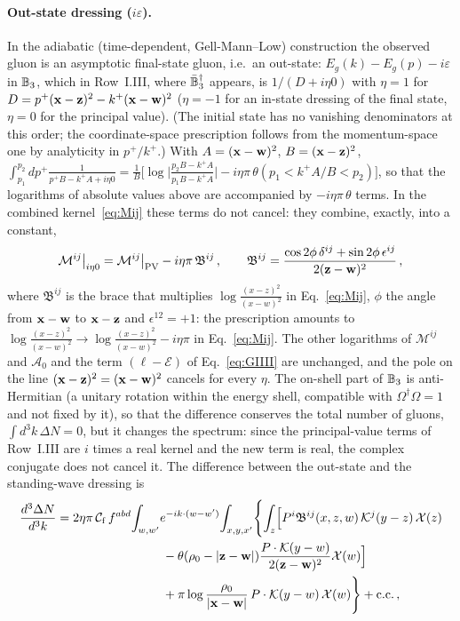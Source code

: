 \paragraph{Out-state dressing ($i\varepsilon$).} In the adiabatic (time-dependent, Gell-Mann--Low) construction the observed gluon is an asymptotic final-state gluon, i.e.\ an out-state: $E_g(k)-E_g(p)-i\varepsilon$ in $\mathbb{B}_3$, which in Row~I.III, where $\bar{\mathbb{B}}_3^\dagger$ appears, is $1/(D+i\eta0)$ with $\eta=1$ for $D=p^+(\mathbf{x}-\mathbf{z})^2-k^+(\mathbf{x}-\mathbf{w})^2$ ($\eta=-1$ for an in-state dressing of the final state, $\eta=0$ for the principal value). (The initial state has no vanishing denominators at this order; the coordinate-space prescription follows from the momentum-space one by analyticity in $p^+/k^+$.) With $A=(\mathbf{x}-\mathbf{w})^2$, $B=(\mathbf{x}-\mathbf{z})^2$, $\int_{p_1}^{p_2}dp^+\frac{1}{p^+B-k^+A+i\eta0}=\frac1B\big[\log\big|\frac{p_2B-k^+A}{p_1B-k^+A}\big|-i\eta\pi\,\theta(p_1<k^+A/B<p_2)\big]$, so that the logarithms of absolute values above are accompanied by $-i\eta\pi\,\theta$ terms. In the combined kernel~\eqref{eq:Mij} these terms do not cancel: they combine, exactly, into a constant,
\begin{align}\label{eq:Mijieps}
\mathcal M^{ij}\big|_{i\eta0}=\mathcal M^{ij}\big|_{\rm PV}-i\eta\pi\,\mathfrak B^{ij}\,,\qquad \mathfrak B^{ij}=\frac{\cos2\phi\,\delta^{ij}+\sin2\phi\,\epsilon^{ij}}{2(\mathbf{z}-\mathbf{w})^2}\,,
\end{align}
where $\mathfrak B^{ij}$ is the brace that multiplies $\log\frac{(x-z)^2}{(x-w)^2}$ in Eq.~\eqref{eq:Mij}, $\phi$ the angle from $\mathbf{x}-\mathbf{w}$ to $\mathbf{x}-\mathbf{z}$ and $\epsilon^{12}=+1$: the prescription amounts to $\log\frac{(x-z)^2}{(x-w)^2}\to\log\frac{(x-z)^2}{(x-w)^2}-i\eta\pi$ in Eq.~\eqref{eq:Mij}. The other logarithms of $\mathcal M^{ij}$ and $\mathcal A_0$ and the term $(\ell-\mathcal E)$ of Eq.~\eqref{eq:GIIII} are unchanged, and the pole on the line $(\mathbf{x}-\mathbf{z})^2=(\mathbf{x}-\mathbf{w})^2$ cancels for every $\eta$. The on-shell part of $\mathbb{B}_3$ is anti-Hermitian (a unitary rotation within the energy shell, compatible with $\Omega^\dagger\Omega=1$ and not fixed by it), so that the difference conserves the total number of gluons, $\int d^3k\,\Delta N=0$, but it changes the spectrum: since the principal-value terms of Row~I.III are $i$ times a real kernel and the new term is real, the complex conjugate does not cancel it. The difference between the out-state and the standing-wave dressing is
\begin{align}\label{eq:DeltaN}
\frac{d^3\Delta N}{d^3k}&=2\eta\pi\,\mathcal C_{\rm f}\,f^{abd}\!\int_{w,w'}\!e^{-ik\cdot(w-w')}\!\int_{x,y,x'}\!\Bigg\{\!\int_z\!\Big[P^i\mathfrak B^{ij}(x,z,w)\,\Kv^j(y-z)\,\mathcal X(z)\notag\\
&\hspace{3cm}-\theta(\rho_0-|\v z-\v w|)\frac{P\cdot\Kv(y-w)}{2(\v z-\v w)^2}\mathcal X(w)\Big]\notag\\&\hspace{3cm}+\pi\log\frac{\rho_0}{|\v x-\v w|}\,P\cdot\Kv(y-w)\,\mathcal X(w)\Bigg\}+{\rm c.c.}\,,
\end{align}
